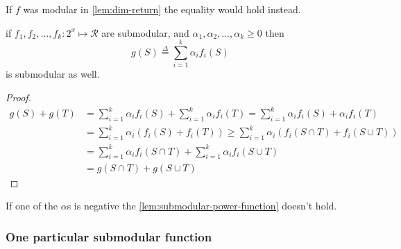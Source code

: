 \begin{obs}
    If $f$ was modular in \cref{lem:dim-return} the equality would hold instead.
\end{obs}

\begin{lem}\label{lem:submodular-power-function}
    if $f_1, f_2, \dots, f_k: 2^x \mapsto \mathcal{R}$ are submodular, and $\alpha_1, \alpha_2 , \dots, \alpha_k \geq 0$ then
    \[
        g(S) \overset{\Delta}{=} \sum_{i=1}^{k} \alpha_i f_i(S)
    \]
    is submodular as well.
\end{lem}

\begin{proof}
    \begin{align*}
        g(S) + g(T) &= \sum_{i=1}^{k} \alpha_i f_i(S) + \sum_{i=1}^{k} \alpha_i f_i(T) = \sum_{i=1}^{k} \alpha_i f_i(S) + \alpha_i f_i(T) \\
        &= \sum_{i=1}^{k} \alpha_i \left( f_i(S) + f_i(T) \right) \geq \sum_{i=1}^{k} \alpha_i \left(f_i (S \cap T) + f_i (S \cup T) \right) \\
        &= \sum_{i=1}^{k} \alpha_i f_i(S \cap T) + \sum_{i=1}^{k} \alpha_i f_i (S \cup T) \\
        &= g(S \cap T) + g(S \cup T)
    \end{align*}
\end{proof}

\begin{obs}
    If one of the $\alpha$s is negative the \cref{lem:submodular-power-function} doesn't hold.
\end{obs}

\subsubsection{One particular submodular function}


